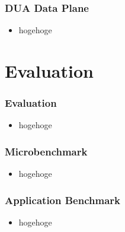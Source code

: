 \documentclass[dvipdfmx,9pt,notheorems]{beamer}
\theoremstyle{definition}
\begin{document}
\begin{frame}\frametitle{DUA Data Plane}
	\begin{itemize}
		\item hogehoge
	\end{itemize}
\pnote{
}
\end{frame}


\section{Evaluation}
\begin{frame}\frametitle{Evaluation}
	\begin{itemize}
			\item hogehoge
	\end{itemize}
\pnote{
}
\end{frame}

\begin{frame}\frametitle{Microbenchmark}
	\begin{itemize}
			\item hogehoge
	\end{itemize}
\pnote{
}
\end{frame}

\begin{frame}\frametitle{Application Benchmark}
	\begin{itemize}
			\item hogehoge
	\end{itemize}
\pnote{
}
\end{frame}


\end{document}
